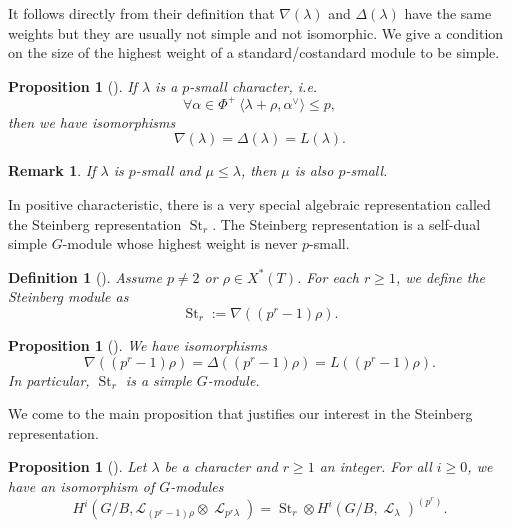 \documentclass[11pt]{amsart}
\numberwithin{subsection}{section}
\numberwithin{figure}{section}
\numberwithin{table}{section}
\theoremstyle{1}
\newtheorem{proposition}[theorem]{Proposition}
\newtheorem{definition}[theorem]{Definition}
\theoremstyle{2}
\newtheorem{rmrk}[theorem]{Remark}
\DeclareMathOperator{\St}{St}
\DeclareMathOperator{\Lc}{\mathcal{L}}
\begin{document}
\vspace*{0.2cm}
It follows directly from their definition that $\nabla(\lambda)$ and $\Delta(\lambda)$ have the same weights but they are usually not simple and not isomorphic. We give a condition on the size of the highest weight of a standard/costandard module to be simple.
\begin{proposition}[{\cite[Part II, sect. 5.6]{MR2015057}}]\label{prop_psmall}
If $\lambda$ is a $p$-small character, i.e. 
\begin{equation*}
\forall \alpha \in \Phi^{+} \ \langle \lambda + \rho, \alpha^{\vee} \rangle \leq p,
\end{equation*}
then we have isomorphisms
\begin{equation*}
\nabla(\lambda) = \Delta(\lambda) = L(\lambda).
\end{equation*}
\end{proposition}
\begin{rmrk}
If $\lambda$ is $p$-small and $\mu \leq \lambda$, then $\mu$ is also $p$-small.
\end{rmrk}
\vspace*{0.2cm}
In positive characteristic, there is a very special algebraic representation called the Steinberg representation $\St_r$. The Steinberg representation is a self-dual simple $G$-module whose highest weight is never $p$-small.
\begin{definition}[{\cite[Part II, sect. 3.18]{MR2015057}}]
Assume $p \neq 2$ or $\rho \in X^*(T)$. For each $r\geq 1$, we define the Steinberg module as
\begin{equation*}
\St_r := \nabla((p^r-1)\rho).
\end{equation*}
\end{definition}
\begin{proposition}[{\cite[Part II, sect. 3.19]{MR2015057}}]
We have isomorphisms
\begin{equation*}
\nabla((p^r-1)\rho) = \Delta((p^r-1)\rho) = L((p^r-1)\rho).
\end{equation*}
In particular, $\St_r$ is a simple $G$-module. 
\end{proposition}
\vspace*{0.2cm}
We come to the main proposition that justifies our interest in the Steinberg representation.
\begin{proposition}[{\cite[Part. 2, Chap. 3, Sect. 19]{MR2015057}}]\label{prop1}
Let $\lambda$ be a character and $r \geq 1$ an integer. For all $i \geq 0$, we have an isomorphism of $G$-modules
\begin{equation*}
H^i(G/B,\mathcal{L}_{(p^r-1)\rho} \otimes \Lc_{p^r\lambda}) = \St_r \otimes H^i(G/B,\Lc_{\lambda})^{(p^r)}.
\end{equation*}
\end{proposition}
\end{document}

